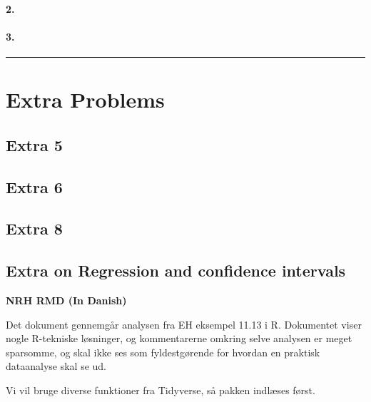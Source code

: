 \documentclass[
]{article}
\begin{document}
\hypertarget{section-93}{%
\paragraph{\texorpdfstring{\textbf{2.}}{2.}}\label{section-93}}

\hypertarget{section-94}{%
\paragraph{\texorpdfstring{\textbf{3.}}{3.}}\label{section-94}}

\begin{center}\rule{0.5\linewidth}{0.5pt}\end{center}

\hypertarget{extra-problems}{%
\section{Extra Problems}\label{extra-problems}}

\hypertarget{extra-5}{%
\subsection{Extra 5}\label{extra-5}}

\hypertarget{extra-6}{%
\subsection{Extra 6}\label{extra-6}}

\hypertarget{extra-8}{%
\subsection{Extra 8}\label{extra-8}}

\hypertarget{extra-on-regression-and-confidence-intervals}{%
\subsection{Extra on Regression and confidence
intervals}\label{extra-on-regression-and-confidence-intervals}}

\textbf{NRH RMD (In Danish)}

Det dokument gennemgår analysen fra EH eksempel 11.13 i R. Dokumentet
viser nogle R-tekniske løsninger, og kommentarerne omkring selve
analysen er meget sparsomme, og skal ikke ses som fyldestgørende for
hvordan en praktisk dataanalyse skal se ud.

Vi vil bruge diverse funktioner fra Tidyverse, så pakken indlæses først.
\end{document}
